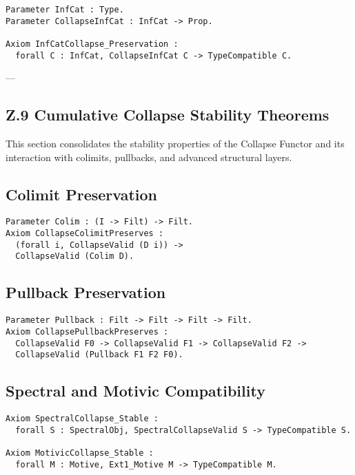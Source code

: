 \documentclass[11pt]{article}
\begin{document}
\begin{lstlisting}[language=Coq]
Parameter InfCat : Type.
Parameter CollapseInfCat : InfCat -> Prop.

Axiom InfCatCollapse_Preservation :
  forall C : InfCat, CollapseInfCat C -> TypeCompatible C.
\end{lstlisting}

---


\subsection*{Z.9 Cumulative Collapse Stability Theorems}

This section consolidates the stability properties of the Collapse Functor and its interaction with colimits, pullbacks, and advanced structural layers.

\subsection*{Colimit Preservation}

\begin{lstlisting}[language=Coq]
Parameter Colim : (I -> Filt) -> Filt.
Axiom CollapseColimitPreserves :
  (forall i, CollapseValid (D i)) ->
  CollapseValid (Colim D).
\end{lstlisting}

\subsection*{Pullback Preservation}

\begin{lstlisting}[language=Coq]
Parameter Pullback : Filt -> Filt -> Filt -> Filt.
Axiom CollapsePullbackPreserves :
  CollapseValid F0 -> CollapseValid F1 -> CollapseValid F2 ->
  CollapseValid (Pullback F1 F2 F0).
\end{lstlisting}

\subsection*{Spectral and Motivic Compatibility}

\begin{lstlisting}[language=Coq]
Axiom SpectralCollapse_Stable :
  forall S : SpectralObj, SpectralCollapseValid S -> TypeCompatible S.

Axiom MotivicCollapse_Stable :
  forall M : Motive, Ext1_Motive M -> TypeCompatible M.
\end{lstlisting}
\end{document}
